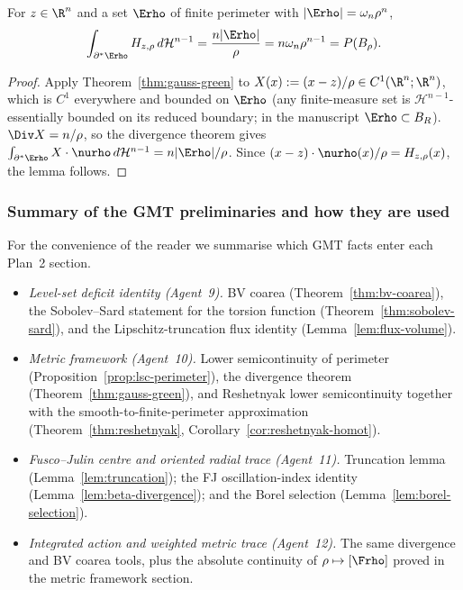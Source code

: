 \begin{lemma}\label{lem:H-total-flux}
For $z\in\R^n$ and a set $\Erho$ of finite perimeter with
$|\Erho|=\omega_n\rho^n$,
\[
   \int_{\partial^*\Erho}H_{z,\rho}\,d\mathcal H^{n-1}
   =\frac{n|\Erho|}{\rho}=n\omega_n\rho^{n-1}=P(B_\rho).
\]
\end{lemma}

\begin{proof}
Apply Theorem~\ref{thm:gauss-green} to $X(x):=(x-z)/\rho\in
C^1(\R^n;\R^n)$, which is $C^1$ everywhere and bounded on $\Erho$
(any finite-measure set is $\mathcal H^{n-1}$-essentially bounded on
its reduced boundary; in the manuscript $\Erho\subset B_R$).
$\Div X=n/\rho$, so the divergence theorem gives
$\int_{\partial^*\Erho}X\cdot\nurho\,d\mathcal H^{n-1}=n|\Erho|/\rho$.
Since $(x-z)\cdot\nurho(x)/\rho=H_{z,\rho}(x)$, the lemma follows.
\end{proof}

\subsubsection{Summary of the GMT preliminaries and how they are used}
\label{ssec:summary}

For the convenience of the reader we summarise which GMT facts enter
each Plan~2 section.

\begin{itemize}
   \item \emph{Level-set deficit identity (Agent~9).}
       BV coarea (Theorem~\ref{thm:bv-coarea}), the Sobolev--Sard
       statement for the torsion function
       (Theorem~\ref{thm:sobolev-sard}), and the Lipschitz-truncation
       flux identity (Lemma~\ref{lem:flux-volume}).

   \item \emph{Metric framework (Agent~10).}
       Lower semicontinuity of perimeter
       (Proposition~\ref{prop:lsc-perimeter}), the divergence
       theorem (Theorem~\ref{thm:gauss-green}), and Reshetnyak lower
       semicontinuity together with the smooth-to-finite-perimeter
       approximation (Theorem~\ref{thm:reshetnyak},
       Corollary~\ref{cor:reshetnyak-homot}).

   \item \emph{Fusco--Julin centre and oriented radial trace
       (Agent~11).}
       Truncation lemma (Lemma~\ref{lem:truncation}); the FJ
       oscillation-index identity (Lemma~\ref{lem:beta-divergence});
       and the Borel selection
       (Lemma~\ref{lem:borel-selection}).

   \item \emph{Integrated action and weighted metric trace
       (Agent~12).}
       The same divergence and BV coarea tools, plus the absolute
       continuity of $\rho\mapsto[\Frho]$ proved in the metric
       framework section.
\end{itemize}

